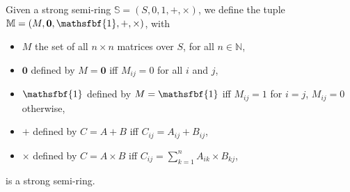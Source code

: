\documentclass[runningheads]{llncs}
\renewcommand{\oplus}{+}
\renewcommand{\otimes}{\times}
\begin{document}
\begin{lemma}
	\label{lem:matrices}
	Given a strong semi-ring \(\mathbb{S} = (S, 0, 1, +, \times )\), we define the tuple \(\mathbb{M} = (M,\mathbf{0} ,\mathsfbf{1} ,\oplus ,\otimes )\), with
	\begin{itemize}
		\item \(M\) the set of all \(n \times n\) matrices over \(S\), for all \(n \in \mathbb{N}\),
		\item \(\mathbf{0} \) defined by \(M = \mathbf{0} \) iff \(M_{ij} = 0\) for all \(i\) and \(j\),
		\item \(\mathsfbf{1} \) defined by \(M = \mathsfbf{1} \) iff \(M_{ij} = 1\) for \(i = j\), \(M_{ij} = 0\) otherwise,
		\item \(\oplus \) defined by \(C = A \oplus B\) iff \(C_{ij} = A_{ij} + B_{ij}\),
		\item \(\otimes \) defined by \(C = A \otimes B\) iff \(C_{ij} = \sum_{k=1}^{n} A_{ik} \times B_{kj}\),
	\end{itemize}
	is a strong semi-ring.
\end{lemma}
\end{document}
